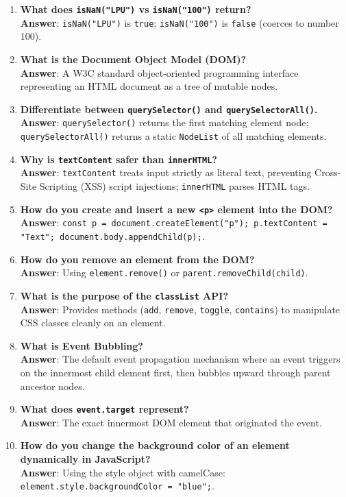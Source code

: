 \begin{enumerate}[leftmargin=1.5em]
    \item \textbf{What does \texttt{isNaN("LPU")} vs \texttt{isNaN("100")} return?}\\
    \textbf{Answer}: \texttt{isNaN("LPU")} is \texttt{true}; \texttt{isNaN("100")} is \texttt{false} (coerces to number 100).

    \item \textbf{What is the Document Object Model (DOM)?}\\
    \textbf{Answer}: A W3C standard object-oriented programming interface representing an HTML document as a tree of mutable nodes.

    \item \textbf{Differentiate between \texttt{querySelector()} and \texttt{querySelectorAll()}.}\\
    \textbf{Answer}: \texttt{querySelector()} returns the first matching element node; \texttt{querySelectorAll()} returns a static \texttt{NodeList} of all matching elements.

    \item \textbf{Why is \texttt{textContent} safer than \texttt{innerHTML}?}\\
    \textbf{Answer}: \texttt{textContent} treats input strictly as literal text, preventing Cross-Site Scripting (XSS) script injections; \texttt{innerHTML} parses HTML tags.

    \item \textbf{How do you create and insert a new \texttt{<p>} element into the DOM?}\\
    \textbf{Answer}: \texttt{const p = document.createElement("p"); p.textContent = "Text"; document.body.appendChild(p);}.

    \item \textbf{How do you remove an element from the DOM?}\\
    \textbf{Answer}: Using \texttt{element.remove()} or \texttt{parent.removeChild(child)}.

    \item \textbf{What is the purpose of the \texttt{classList} API?}\\
    \textbf{Answer}: Provides methods (\texttt{add}, \texttt{remove}, \texttt{toggle}, \texttt{contains}) to manipulate CSS classes cleanly on an element.

    \item \textbf{What is Event Bubbling?}\\
    \textbf{Answer}: The default event propagation mechanism where an event triggers on the innermost child element first, then bubbles upward through parent ancestor nodes.

    \item \textbf{What does \texttt{event.target} represent?}\\
    \textbf{Answer}: The exact innermost DOM element that originated the event.

    \item \textbf{How do you change the background color of an element dynamically in JavaScript?}\\
    \textbf{Answer}: Using the style object with camelCase: \texttt{element.style.backgroundColor = "blue";}.
\end{enumerate}
